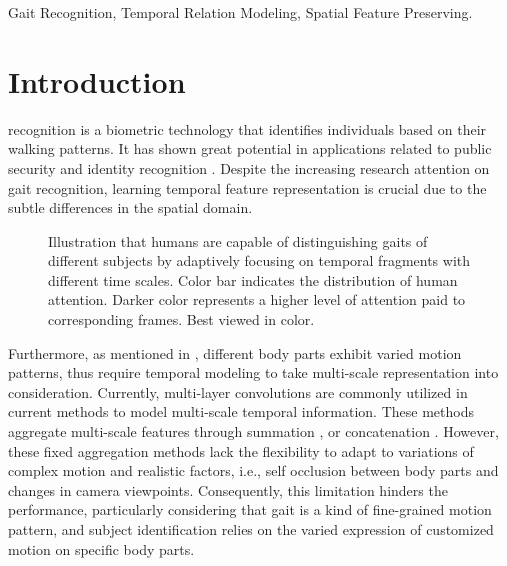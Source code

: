 \documentclass[journal]{IEEEtran}
\begin{document}
\begin{IEEEkeywords}
Gait Recognition, Temporal Relation Modeling, Spatial Feature Preserving.
\end{IEEEkeywords}

\section{Introduction}
\label{sec:introduction}
 recognition is a biometric technology that identifies individuals based on their walking patterns. It has shown great potential in applications related to public security \cite{larsen2008gait, bouchrika2011using, yang2014influence, yang2014variability} and  identity recognition \cite{macoveciuc2019forensic, balazia2017human, premalatha2020improved}. Despite the increasing research attention on gait recognition, learning temporal feature representation is crucial due to the subtle differences in the spatial domain.

\begin{figure}[ht]
\label{motivation}
\centering
{}

\centering
\caption{Illustration that humans are capable of distinguishing gaits of different subjects by adaptively focusing on temporal fragments with different time scales. Color bar indicates the distribution of human attention. Darker color represents a higher level of attention paid to corresponding frames. Best viewed in color.}
\label{fig:motivation}
\end{figure}

Furthermore, as mentioned in \cite{fan2020gaitpart}, different body parts exhibit varied motion patterns, thus require temporal modeling to take multi-scale representation into consideration. Currently, multi-layer convolutions are commonly utilized in current methods to model multi-scale temporal information. These methods aggregate multi-scale features through summation \cite{fan2020gaitpart, wu2020condition, zhang2019cross, zhang2020learning}, or concatenation \cite{lin2020gait, GaitGL}. However, these fixed aggregation methods lack the flexibility to adapt to variations of complex motion and realistic factors, i.e., self occlusion between body parts and changes in camera viewpoints. Consequently, this limitation hinders the performance, particularly considering that gait is a kind of fine-grained motion pattern, and subject identification relies on the varied expression of customized motion on specific body parts.
\end{document}
